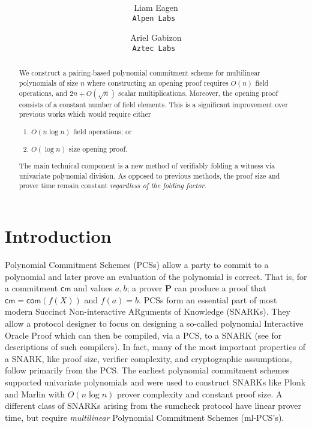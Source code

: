 \documentclass[11pt]{article} %
\title{ \bf \papertitle \\[0.72cm]}
\author{ Liam Eagen \\ \tt{Alpen Labs}   \and Ariel Gabizon \\ \tt{Aztec Labs} }
\newcommand{\com}{\ensuremath{\mathsf{com}}\xspace}
\newcommand{\cm}{\ensuremath{\mathsf{cm}}\xspace}
\newcommand{\prv}{\ensuremath{\mathsf{\mathbf{P}}}\xspace}
\newcommand{\mlpcs}{ml-PCS\xspace}
\begin{document}
    \maketitle
\begin{abstract}
We construct a pairing-based polynomial commitment scheme for multilinear polynomials  of size $n$ where
constructing an opening proof requires  $O(n)$ field operations, and $2n+O(\sqrt n)$ scalar multiplications. Moreover,
the opening proof consists of a constant number of field elements.
This is a significant improvement over previous works which would require either
\begin{enumerate}
 \item $O(n\log n)$ field operations; or
 \item $O(\log n)$ size opening proof.
\end{enumerate}
The main technical component is a new method of verifiably folding a witness via univariate polynomial division.
As opposed to previous methods, the proof size and prover time remain constant \emph{regardless of the folding factor}.
\end{abstract}
\section{Introduction}
    Polynomial Commitment Schemes (PCSs)\cite{kzg} allow a party to commit to a polynomial and later prove an evaluation of the polynomial is correct.
    That is, for a commitment $\cm$ and values $a,b$; a prover  \prv can produce a proof that $\cm = \com(f(X))$ and $f(a) = b$.
    PCSs form an essential part of most modern Succinct Non-interactive ARguments of Knowledge (SNARKs). They allow a protocol designer to focus on designing a so-called  polynomial Interactive Oracle Proof  which can then be compiled, via a PCS, to a SNARK (see \cite{dark,plonk,marlin} for descriptions of such compilers).
    In fact, many of the most important properties of a SNARK, like proof size, verifier complexity, and cryptographic assumptions, follow primarily from the PCS.
    The earliest polynomial commitment schemes \cite{kzg} supported univariate polynomials and were used to construct SNARKs like Plonk \cite{plonk} and Marlin \cite{marlin} with $O(n \log n)$ prover complexity and constant proof size.
    A different class of SNARKs \cite{spartan, hyperplonk} arising from the sumcheck protocol \cite{lfkn} have linear prover time, but require \emph{multilinear} Polynomial Commitment Schemes (\mlpcs's).
    
\end{document}
